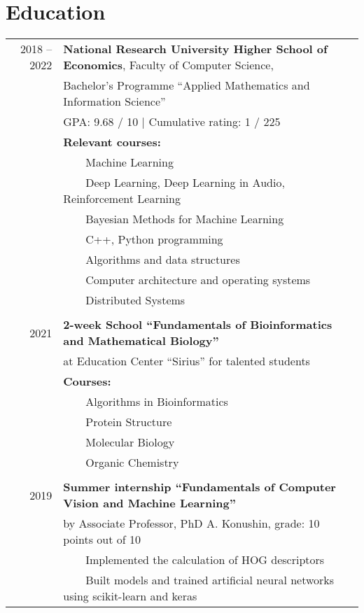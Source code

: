 \documentclass[a4paper,10pt]{article}
\newcommand{\tabitem}{~~\llap{\textbullet}~~}
\begin{document}
\section{Education}
\begin{tabular}{rl}	
2018 -- 2022 & \textbf{National Research University Higher School of Economics}, Faculty of Computer Science, \\ & Bachelor’s Programme “Applied Mathematics and Information Science”\\
& GPA: 9.68 / 10 | Cumulative rating: 1 / 225 \\
& \textbf{Relevant courses:}\\
& \tabitem Machine Learning \\
& \tabitem Deep Learning, Deep Learning in Audio, Reinforcement Learning \\
& \tabitem Bayesian Methods for Machine Learning \\
& \tabitem C++, Python programming \\
& \tabitem Algorithms and data structures \\
& \tabitem Computer architecture and operating systems \\
& \tabitem Distributed Systems \\
& \\
2021 & \textbf{2-week School ``Fundamentals of Bioinformatics and Mathematical Biology''} \\
& at Education Center ``Sirius'' for talented students \\
& \textbf{Courses:}\\
& \tabitem Algorithms in Bioinformatics \\
& \tabitem Protein Structure \\
& \tabitem Molecular Biology \\
& \tabitem Organic Chemistry \\
& \\
2019 & \textbf{Summer internship “Fundamentals of Computer Vision and Machine Learning”} \\
& by Associate Professor, PhD A. Konushin, grade: 10 points out of 10 \\
& \tabitem Implemented the calculation of HOG descriptors \\
& \tabitem Built models and trained artificial neural networks using scikit-learn and keras 
\end{tabular}
\end{document}
